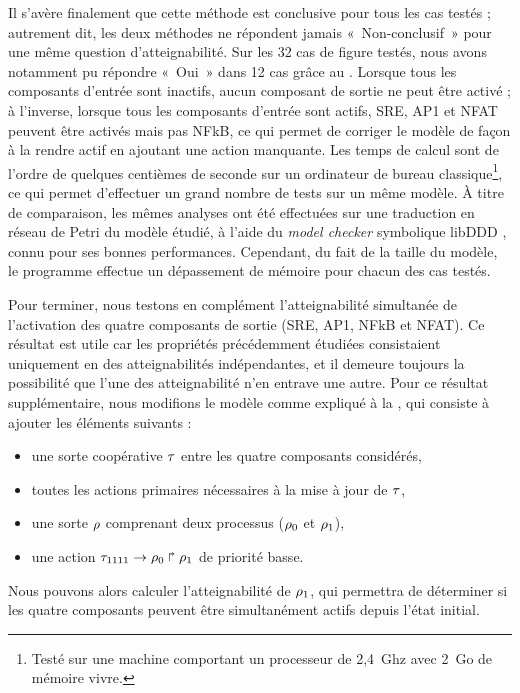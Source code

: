 Il s'avère finalement que cette méthode est conclusive pour tous les cas testés ;
autrement dit, les deux méthodes ne répondent jamais «~Non-conclusif~»
pour une même question d'atteignabilité.
Sur les 32 cas de figure testés,
nous avons notamment pu répondre «~Oui~» dans 12 cas
grâce au .
Lorsque tous les composants d'entrée sont inactifs, aucun composant de sortie ne peut
être activé ;
à l'inverse, lorsque tous les composants d'entrée sont actifs,
SRE, AP1 et NFAT peuvent être activés mais pas NFkB,
ce qui permet de corriger le modèle de façon à la rendre actif en ajoutant une action manquante.
Les temps de calcul sont de l'ordre de quelques centièmes de seconde sur un ordinateur
de bureau classique\footnote{Testé sur une machine comportant
un processeur de 2,4~Ghz avec 2~Go de mémoire vivre.},
ce qui permet d'effectuer un grand nombre de tests sur un même modèle.
À titre de comparaison, les mêmes analyses ont été effectuées 
sur une traduction en réseau de Petri du modèle étudié,
à l'aide du \textit{model checker} symbolique libDDD \cite{Kordon09libddd},
connu pour ses bonnes performances.
Cependant, du fait de la taille du modèle, le programme effectue un dépassement de mémoire
pour chacun des cas testés.

\myskip

Pour terminer, nous testons en complément l'atteignabilité simultanée
de l'activation des quatre composants de sortie (SRE, AP1, NFkB et NFAT).
Ce résultat est utile car les propriétés précédemment étudiées consistaient uniquement
en des atteignabilités indépendantes, et il demeure toujours la possibilité
que l'une des atteignabilité n'en entrave une autre.
Pour ce résultat supplémentaire, nous modifions le modèle comme expliqué à la
, qui consiste à ajouter les éléments suivants :
\begin{itemize}
  \item une sorte coopérative $\tau$ entre les quatre composants considérés,
  \item toutes les actions primaires nécessaires à la mise à jour de $\tau$,
  \item une sorte $\rho$ comprenant deux processus ($\rho_0$ et $\rho_1$),
  \item une action $\tau_{1111}\rightarrow\rho_0\Rsh\rho_1$ de priorité basse.
\end{itemize}
Nous pouvons alors calculer l'atteignabilité de $\rho_1$, qui permettra de déterminer
si les quatre composants peuvent être simultanément actifs depuis l'état initial.

